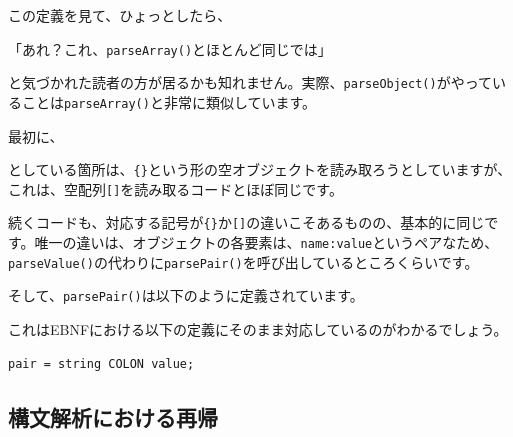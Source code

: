 この定義を見て、ひょっとしたら、

「あれ？これ、\texttt{parseArray()}とほとんど同じでは」

と気づかれた読者の方が居るかも知れません。実際、\texttt{parseObject()}がやっていることは\texttt{parseArray()}と非常に類似しています。

最初に、

\begin{Shaded}
\begin{Highlighting}[]
\NormalTok{();}
\NormalTok{();}
 \NormalTok{(} \NormalTok{\textless{}\textgreater{}());}
\end{Highlighting}
\end{Shaded}

としている箇所は、\texttt{\{\}}という形の空オブジェクトを読み取ろうとしていますが、これは、空配列\texttt{{[}{]}}を読み取るコードとほぼ同じです。

続くコードも、対応する記号が\texttt{\{\}}か\texttt{{[}{]}}の違いこそあるものの、基本的に同じです。唯一の違いは、オブジェクトの各要素は、\texttt{name:value}というペアなため、\texttt{parseValue()}の代わりに\texttt{parsePair()}を呼び出しているところくらいです。

そして、\texttt{parsePair()}は以下のように定義されています。

\begin{Shaded}
\begin{Highlighting}[]
    \NormalTok{\textgreater{} }\NormalTok{() \{}
\NormalTok{();}
        \NormalTok{();}
\NormalTok{();}
         
\NormalTok{    \}}
\end{Highlighting}
\end{Shaded}

これはEBNFにおける以下の定義にそのまま対応しているのがわかるでしょう。

\begin{verbatim}
pair = string COLON value;
\end{verbatim}

\hypertarget{chapter3-ux69cbux6587ux89e3ux6790ux306bux304aux3051ux308bux518dux5e30}{%
\subsection{構文解析における再帰}\label{chapter3-ux69cbux6587ux89e3ux6790ux306bux304aux3051ux308bux518dux5e30}}

